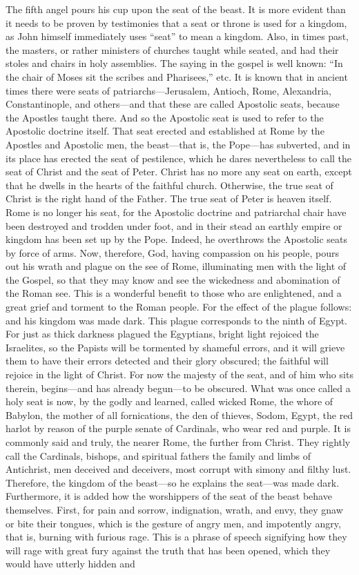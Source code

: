 The fifth angel pours his cup upon the seat of the beast. It is more evident than it needs to be proven by testimonies that a seat or throne is used for a kingdom, as John himself immediately uses “seat” to mean a kingdom. Also, in times past, the masters, or rather ministers of churches taught while seated, and had their stoles and chairs in holy assemblies. The saying in the gospel is well known: “In the chair of Moses sit the scribes and Pharisees,” etc. It is known that in ancient times there were seats of patriarchs—Jerusalem, Antioch, Rome, Alexandria, Constantinople, and others—and that these are called Apostolic seats, because the Apostles taught there. And so the Apostolic seat is used to refer to the Apostolic doctrine itself. That seat erected and established at Rome by the Apostles and Apostolic men, the beast—that is, the Pope—has subverted, and in its place has erected the seat of pestilence, which he dares nevertheless to call the seat of Christ and the seat of Peter. Christ has no more any seat on earth, except that he dwells in the hearts of the faithful church. Otherwise, the true seat of Christ is the right hand of the Father. The true seat of Peter is heaven itself. Rome is no longer his seat, for the Apostolic doctrine and patriarchal chair have been destroyed and trodden under foot, and in their stead an earthly empire or kingdom has been set up by the Pope. Indeed, he overthrows the Apostolic seats by force of arms. Now, therefore, God, having compassion on his people, pours out his wrath and plague on the see of Rome, illuminating men with the light of the Gospel, so that they may know and see the wickedness and abomination of the Roman see. This is a wonderful benefit to those who are enlightened, and a great grief and torment to the Roman people. For the effect of the plague follows: and his kingdom was made dark. This plague corresponds to the ninth of Egypt. For just as thick darkness plagued the Egyptians, bright light rejoiced the Israelites, so the Papists will be tormented by shameful errors, and it will grieve them to have their errors detected and their glory obscured; the faithful will rejoice in the light of Christ. For now the majesty of the seat, and of him who sits therein, begins—and has already begun—to be obscured. What was once called a holy seat is now, by the godly and learned, called wicked Rome, the whore of Babylon, the mother of all fornications, the den of thieves, Sodom, Egypt, the red harlot by reason of the purple senate of Cardinals, who wear red and purple. It is commonly said and truly, the nearer Rome, the further from Christ. They rightly call the Cardinals, bishops, and spiritual fathers the family and limbs of Antichrist, men deceived and deceivers, most corrupt with simony and filthy lust. Therefore, the kingdom of the beast—so he explains the seat—was made dark. Furthermore, it is added how the worshippers of the seat of the beast behave themselves. First, for pain and sorrow, indignation, wrath, and envy, they gnaw or bite their tongues, which is the gesture of angry men, and impotently angry, that is, burning with furious rage. This is a phrase of speech signifying how they will rage with great fury against the truth that has been opened, which they would have utterly hidden and 